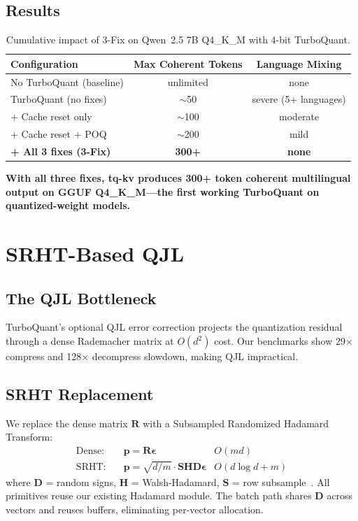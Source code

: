 \documentclass[11pt]{article}
\begin{document}
\subsection{Results}

\begin{table}[h]
\centering
\caption{Cumulative impact of 3-Fix on Qwen~2.5 7B Q4\_K\_M with 4-bit TurboQuant.}
\label{tab:3fix}
\begin{tabular}{@{}lcc@{}}
\toprule
Configuration & Max Coherent Tokens & Language Mixing \\
\midrule
No TurboQuant (baseline) & unlimited & none \\
TurboQuant (no fixes) & $\sim$50 & severe (5+ languages) \\
+ Cache reset only & $\sim$100 & moderate \\
+ Cache reset + POQ & $\sim$200 & mild \\
\textbf{+ All 3 fixes (3-Fix)} & \textbf{300+} & \textbf{none} \\
\bottomrule
\end{tabular}
\end{table}

\textbf{With all three fixes, tq-kv produces 300+ token coherent multilingual output on GGUF Q4\_K\_M---the first working TurboQuant on quantized-weight models.}

\section{SRHT-Based QJL}
\label{sec:srht}

\subsection{The QJL Bottleneck}

TurboQuant's optional QJL error correction projects the quantization residual through a dense Rademacher matrix at $O(d^2)$ cost. Our benchmarks show 29$\times$ compress and 128$\times$ decompress slowdown, making QJL impractical.

\subsection{SRHT Replacement}

We replace the dense matrix $\mathbf{R}$ with a Subsampled Randomized Hadamard Transform:
\begin{align}
    \text{Dense:}\quad & \mathbf{p} = \mathbf{R} \boldsymbol{\epsilon} & O(md) \\
    \text{SRHT:}\quad & \mathbf{p} = \sqrt{d/m} \cdot \mathbf{S} \mathbf{H} \mathbf{D} \boldsymbol{\epsilon} & O(d \log d + m)
\end{align}
where $\mathbf{D}$ = random signs, $\mathbf{H}$ = Walsh-Hadamard, $\mathbf{S}$ = row subsample~\citep{ailon2009fast}. All primitives reuse our existing Hadamard module. The batch path shares $\mathbf{D}$ across vectors and reuses buffers, eliminating per-vector allocation.
\end{document}
